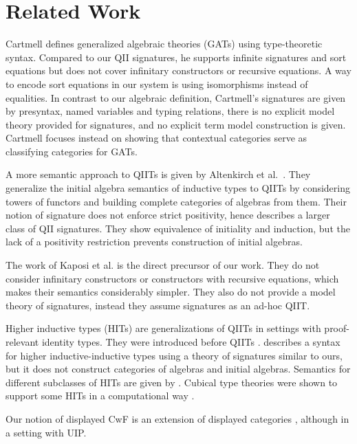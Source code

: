 \documentclass{article}
\theoremstyle{definition}
\theoremstyle{theorem}
\begin{document}
\section{Related Work}
\label{sec:relatedwork}

Cartmell \cite{gat} defines generalized algebraic theories (GATs) using
type-theoretic syntax. Compared to our QII signatures, he supports infinite
signatures and sort equations but does not cover infinitary constructors or
recursive equations. A way to encode sort equations in our system is using
isomorphisms instead of equalities. In contrast to our algebraic definition,
Cartmell's signatures are given by presyntax, named variables and typing
relations, there is no explicit model theory provided for signatures, and no
explicit term model construction is given. Cartmell focuses instead on showing
that contextual categories serve as classifying categories for GATs.

A more semantic approach to QIITs is given by Altenkirch et
al.\ \cite{qiits}. They generalize the initial algebra semantics of inductive
types to QIITs by considering towers of functors and building complete
categories of algebras from them. Their notion of signature does not enforce
strict positivity, hence describes a larger class of QII signatures. They show
equivalence of initiality and induction, but the lack of a positivity
restriction prevents construction of initial algebras.

The work of Kaposi et al. \cite{kaposi2019constructing} is the direct precursor
of our work. They do not consider infinitary constructors or constructors with
recursive equations, which makes their semantics considerably simpler. They also
do not provide a model theory of signatures, instead they assume signatures as
an ad-hoc QIIT.

Higher inductive types (HITs) are generalizations of QIITs in settings with
proof-relevant identity types. They were introduced before QIITs
\cite{HoTTbook}. \cite{hiit} describes a syntax for higher inductive-inductive
types using a theory of signatures similar to ours, but it does not construct
categories of algebras and initial algebras. Semantics for different subclasses
of HITs are given by
\cite{lumsdaineShulman,10.1145/3209108.3209130,nielsmsc,sojakova,moeneclaey}. Cubical
type theories were shown to support some HITs in a computational way
\cite{cubicalhits,10.1145/3290314}.

Our notion of displayed CwF is an extension of displayed categories
\cite{displayedcats}, although in a setting with UIP.
\end{document}
